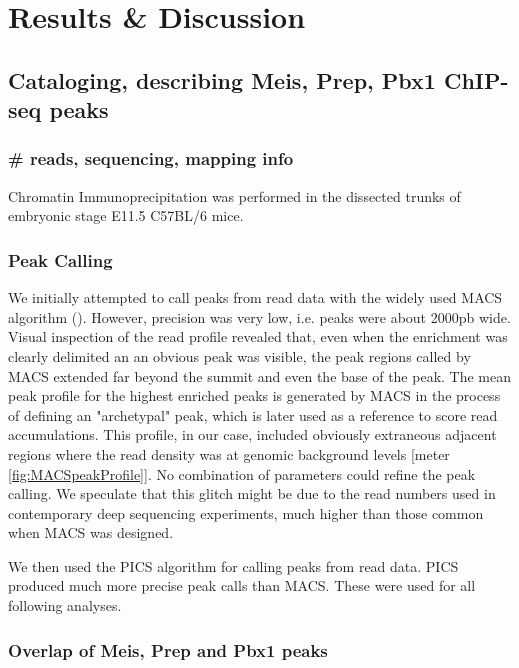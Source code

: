 \chapter{Results \& Discussion}
\label{chp:results}

\section{Cataloging, describing Meis, Prep, Pbx1 ChIP-seq peaks}

\subsection{\# reads, sequencing, mapping info}
Chromatin Immunoprecipitation was performed in the dissected trunks of embryonic stage E11.5 C57BL/6 mice.





\subsection{Peak Calling}

We initially attempted to call peaks from read data with the widely used \ac{MACS} algorithm (\cite{MACS ref}). However, precision was very low, i.e. peaks were about 2000pb wide. Visual inspection of the read profile revealed that, even when the enrichment was clearly delimited an an obvious peak was visible, the peak regions called by \ac{MACS} extended far beyond the summit and even the base of the peak. The mean peak profile for the highest enriched peaks is generated by \ac{MACS} in the process of defining an "archetypal" peak, which is later used as a reference to score read accumulations. This profile, in our case, included obviously extraneous adjacent regions where the read density was at genomic background levels [meter \ref{fig:MACSpeakProfile}]. No combination of parameters could refine the peak calling. We speculate that this glitch might be due to the read numbers used in contemporary deep sequencing experiments, much higher than those common when \ac{MACS} was designed.

We then used the \ac{PICS} algorithm \cite{ref} for calling peaks from read data. \ac{PICS} produced much more precise peak calls than \ac{MACS}. These were used for all following analyses.

\subsection{Overlap of Meis, Prep and Pbx1 peaks}

